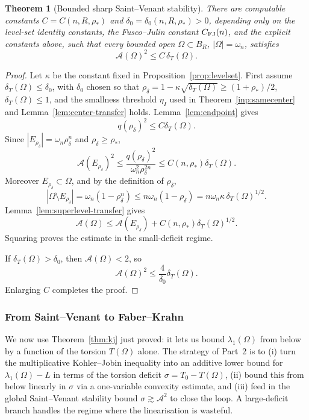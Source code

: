 \documentclass[11pt]{amsart}
\newtheorem{theorem}{Theorem}[section]
\theoremstyle{definition}
\newcommand{\Om}{\Omega}
\newcommand{\Fr}{\mathcal A}
\newcommand{\dT}{\delta_T}
\newcommand{\rstar}{\rho_*}
\newcommand{\rdel}{\rho_\delta}
\begin{document}
\begin{theorem}[Bounded sharp Saint--Venant stability]
\label{thm:boundedSV}
There are computable constants \(C=C(n,R,\rstar)\) and
\(\delta_0=\delta_0(n,R,\rstar)>0\), depending only on the level-set
identity constants, the Fusco--Julin constant \(C_{\rm FJ}(n)\),
and the explicit constants above, such that every bounded open \(\Om\subset B_R\),
\(|\Om|=\omega_n\), satisfies
\[
   \Fr(\Om)^2\le C\,\dT(\Om).
\]
\end{theorem}

\begin{proof}
Let \(\kappa\) be the constant fixed in Proposition~\ref{prop:levelset}.
First assume \(\dT(\Om)\le\delta_0\), with \(\delta_0\) chosen so that
\(\rdel=1-\kappa\sqrt{\dT(\Om)}\ge(1+\rstar)/2\), \(\dT(\Om)\le1\), and
the smallness threshold \(\eta_I\) used in
Theorem~\ref{inp:samecenter} and Lemma~\ref{lem:center-transfer} holds.
Lemma~\ref{lem:endpoint} gives
\[
   q(\rdel)^2\le C\dT(\Om).
\]
Since \(|E_{\rdel}|=\omega_n\rdel^n\) and \(\rdel\ge\rstar\),
\[
   \Fr(E_{\rdel})^2
   \le \frac{q(\rdel)^2}{\omega_n^2\rdel^{2n}}
   \le C(n,\rstar)\dT(\Om).
\]
Moreover \(E_{\rdel}\subset\Om\), and by the definition of \(\rdel\),
\[
   |\Om\setminus E_{\rdel}|
   =\omega_n(1-\rdel^n)
   \le n\omega_n(1-\rdel)
   =n\omega_n\kappa\,\dT(\Om)^{1/2}.
\]
Lemma~\ref{lem:superlevel-transfer} gives
\[
   \Fr(\Om)
   \le \Fr(E_{\rdel})+C(n,\rstar)\dT(\Om)^{1/2}.
\]
Squaring proves the estimate in the small-deficit regime.

If \(\dT(\Om)>\delta_0\), then \(\Fr(\Om)<2\), so
\[
   \Fr(\Om)^2\le \frac{4}{\delta_0}\dT(\Om).
\]
Enlarging \(C\) completes the proof.
\end{proof}

\subsubsection{From Saint--Venant to Faber--Krahn}
\label{ssec:transfer}

We now use Theorem~\ref{thm:kj} just proved: it lets us bound
$\lambda_1(\Om)$ from below by a function of the torsion $T(\Om)$ alone. The
strategy of Part~2 is to (i) turn the multiplicative Kohler--Jobin
inequality into an additive lower bound for $\lambda_1(\Om)-L$ in terms of
the torsion deficit $\sigma=T_0-T(\Om)$, (ii) bound this from below linearly
in $\sigma$ via a one-variable convexity estimate, and (iii) feed in the
global Saint--Venant stability bound $\sigma\gtrsim\Fr^2$ to close the loop.
A large-deficit branch handles the regime where the linearisation is wasteful.
\end{document}
